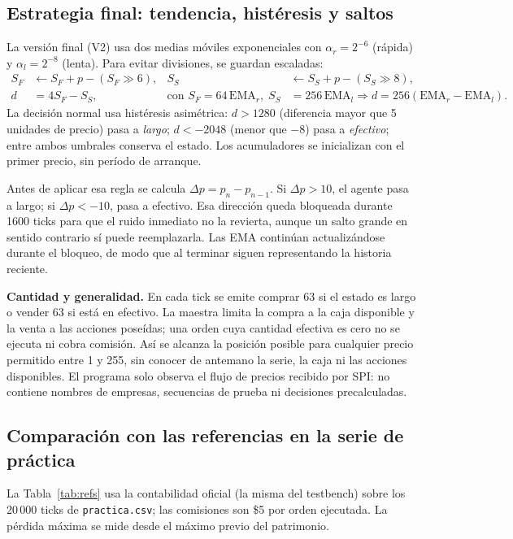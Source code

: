 \documentclass[11pt,letterpaper]{article}
\renewcommand{\_}{\textunderscore\allowbreak}
\begin{document}
\subsection{Estrategia final: tendencia, histéresis y saltos}
La versión final (V2) usa dos medias móviles exponenciales con $\alpha_r=2^{-6}$ (rápida) y $\alpha_l=2^{-8}$ (lenta). Para evitar divisiones, se guardan escaladas:
\begin{align}
S_F &\leftarrow S_F + p - (S_F \gg 6), & S_S &\leftarrow S_S + p - (S_S \gg 8),\\
d &= 4S_F - S_S, & \text{con } S_F = 64\,\mathrm{EMA}_r,\; S_S &= 256\,\mathrm{EMA}_l \Rightarrow d = 256(\mathrm{EMA}_r-\mathrm{EMA}_l).
\end{align}
La decisión normal usa histéresis asimétrica: $d>1280$ (diferencia mayor que 5 unidades de precio) pasa a \emph{largo}; $d<-2048$ (menor que $-8$) pasa a \emph{efectivo}; entre ambos umbrales conserva el estado. Los acumuladores se inicializan con el primer precio, sin período de arranque.

Antes de aplicar esa regla se calcula $\Delta p=p_n-p_{n-1}$. Si $\Delta p>10$, el agente pasa a largo; si $\Delta p<-10$, pasa a efectivo. Esa dirección queda bloqueada durante 1600 ticks para que el ruido inmediato no la revierta, aunque un salto grande en sentido contrario sí puede reemplazarla. Las EMA continúan actualizándose durante el bloqueo, de modo que al terminar siguen representando la historia reciente.

\textbf{Cantidad y generalidad.} En cada tick se emite comprar 63 si el estado es largo o vender 63 si está en efectivo. La maestra limita la compra a la caja disponible y la venta a las acciones poseídas; una orden cuya cantidad efectiva es cero no se ejecuta ni cobra comisión. Así se alcanza la posición posible para cualquier precio permitido entre 1 y 255, sin conocer de antemano la serie, la caja ni las acciones disponibles. El programa solo observa el flujo de precios recibido por SPI: no contiene nombres de empresas, secuencias de prueba ni decisiones precalculadas.

\subsection{Comparación con las referencias en la serie de práctica}
La Tabla~\ref{tab:refs} usa la contabilidad oficial (la misma del testbench) sobre los 20\,000 ticks de \texttt{practica.csv}; las comisiones son \$5 por orden ejecutada. La pérdida máxima se mide desde el máximo previo del patrimonio.
\end{document}
